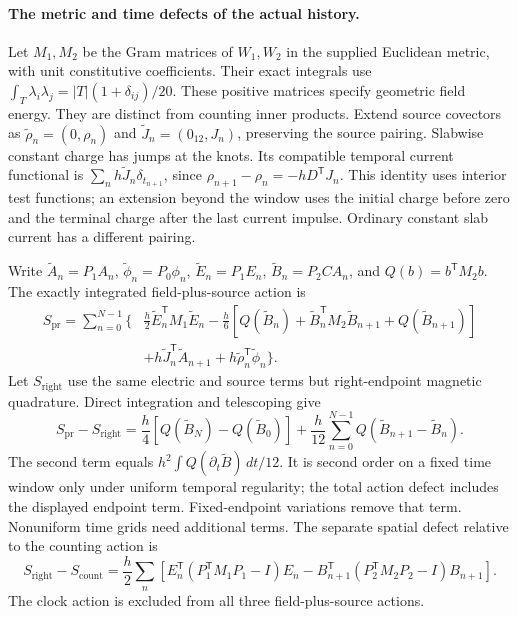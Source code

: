 \paragraph{The metric and time defects of the actual history.}
Let \(M_1,M_2\) be the Gram matrices of \(W_1,W_2\) in the supplied
Euclidean metric, with unit constitutive coefficients. Their exact
integrals use \(\int_T\lambda_i\lambda_j=|T|(1+\delta_{ij})/20\).
These positive matrices specify geometric field energy. They are distinct
from counting inner products. Extend source covectors as
\(\widetilde\rho_n=(0,\rho_n)\) and
\(\widetilde J_n=(0_{12},J_n)\), preserving the source pairing.
Slabwise constant charge has jumps at the knots. Its compatible temporal
current functional is
\(\sum_n h\widetilde J_n\delta_{t_{n+1}}\), since
\(\rho_{n+1}-\rho_n=-hD^{\mathsf T}J_n\).
This identity uses interior test functions; an extension beyond the window
uses the initial charge before zero and the terminal charge after the last
current impulse. Ordinary constant slab current has a different pairing.

Write \(\widetilde A_n=P_1A_n\), \(\widetilde\phi_n=P_0\phi_n\),
\(\widetilde E_n=P_1E_n\), \(\widetilde B_n=P_2CA_n\), and
\(Q(b)=b^{\mathsf T}M_2b\). The exactly integrated field-plus-source action is
\begin{align*}
 S_{\mathrm{pr}}=\sum_{n=0}^{N-1}\biggl\{&
 \frac h2\widetilde E_n^{\mathsf T}M_1\widetilde E_n
 -\frac h6\left[Q(\widetilde B_n)+
 \widetilde B_n^{\mathsf T}M_2\widetilde B_{n+1}+Q(\widetilde B_{n+1})\right]\\
 &+h\widetilde J_n^{\mathsf T}\widetilde A_{n+1}
 +h\widetilde\rho_n^{\mathsf T}\widetilde\phi_n\biggr\}.
\end{align*}
Let \(S_{\mathrm{right}}\) use the same electric and source terms but
right-endpoint magnetic quadrature. Direct integration and telescoping give
\begin{equation}
 S_{\mathrm{pr}}-S_{\mathrm{right}}
 =\frac h4\left[Q(\widetilde B_N)-Q(\widetilde B_0)\right]
 +\frac h{12}\sum_{n=0}^{N-1}Q(\widetilde B_{n+1}-\widetilde B_n).
 \label{eq:cone-time-action-defect}
\end{equation}
The second term equals
\(h^2\int Q(\partial_t\widetilde B)\,dt/12\).
It is second order on a fixed time window only under uniform temporal regularity; the total action
defect includes the displayed endpoint term. Fixed-endpoint variations
remove that term. Nonuniform time grids need additional terms.
The separate spatial defect relative to the counting action is
\[
 S_{\mathrm{right}}-S_{\mathrm{count}}
 =\frac h2\sum_n\left[
 E_n^{\mathsf T}(P_1^{\mathsf T}M_1P_1-I)E_n
 -B_{n+1}^{\mathsf T}(P_2^{\mathsf T}M_2P_2-I)B_{n+1}\right].
\]
The clock action is excluded from all three field-plus-source actions.

